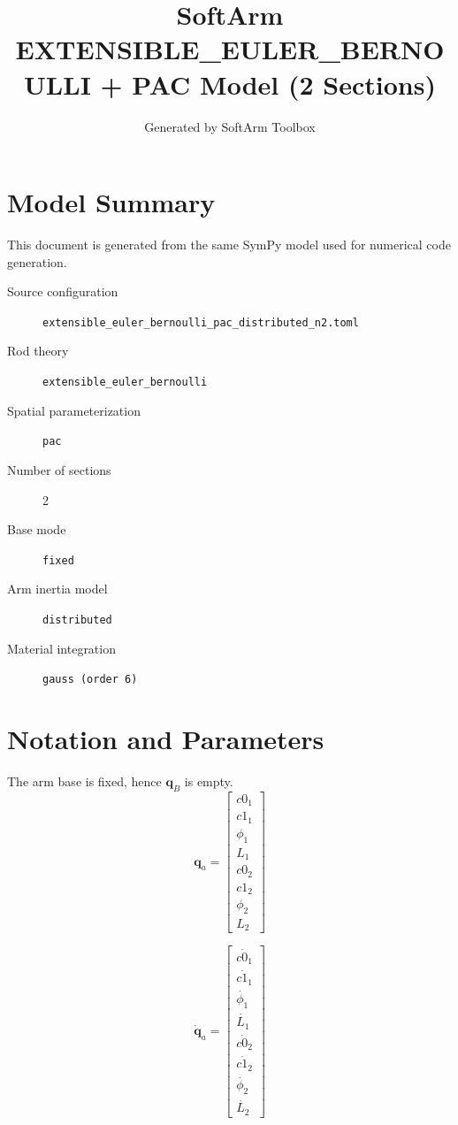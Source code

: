\documentclass[11pt]{article}
\title{SoftArm EXTENSIBLE\_EULER\_BERNOULLI + PAC Model (2 Sections)}
\author{Generated by SoftArm Toolbox}
\date{}
\begin{document}
\maketitle

\section{Model Summary}
This document is generated from the same SymPy model used for numerical code generation.
\begin{description}
\item[Source configuration] \texttt{extensible\_euler\_bernoulli\_pac\_distributed\_n2.toml}
\item[Rod theory] \texttt{extensible\_euler\_bernoulli}
\item[Spatial parameterization] \texttt{pac}
\item[Number of sections] 2
\item[Base mode] \texttt{fixed}
\item[Arm inertia model] \texttt{distributed}
\item[Material integration] \texttt{gauss (order 6)}
\end{description}

\section{Notation and Parameters}
The arm base is fixed, hence $\boldsymbol q_B$ is empty.
\begin{equation}
\boldsymbol q_a=\begin{bmatrix}c0_{1}\\c1_{1}\\\phi_{1}\\L_{1}\\c0_{2}\\c1_{2}\\\phi_{2}\\L_{2}\end{bmatrix}
\end{equation}

\begin{equation}
\dot{\boldsymbol q}_a=\begin{bmatrix}\dot{c0_{1}}\\\dot{c1_{1}}\\\dot{\phi_{1}}\\\dot{L_{1}}\\\dot{c0_{2}}\\\dot{c1_{2}}\\\dot{\phi_{2}}\\\dot{L_{2}}\end{bmatrix}
\end{equation}
\end{document}
